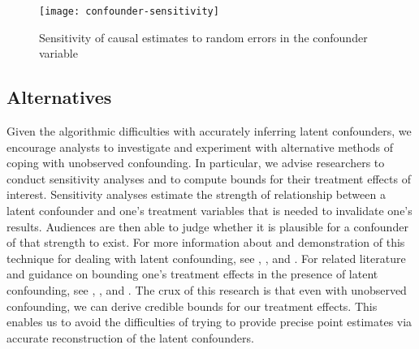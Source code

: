 \begin{figure}
   \centering
   \texttt{[image: confounder-sensitivity]}
   \caption{Sensitivity of causal estimates to random errors in the confounder variable}
   \label{fig:confounder-sensitivity}
\end{figure}

\subsection{Alternatives}
\label{sec:deconfounder-alternatives}
Given the algorithmic difficulties with accurately inferring latent confounders,
we encourage analysts to investigate and experiment with alternative methods of
coping with unobserved confounding.
In particular, we advise researchers to conduct sensitivity analyses and to compute bounds for their treatment effects of interest.
Sensitivity analyses estimate the strength of relationship between a latent confounder and one's treatment variables that is needed to invalidate one's results.
Audiences are then able to judge whether it is plausible for a confounder of that strength to exist.
For more information about and demonstration of this technique for dealing with latent confounding,
see \citet{rosenbaum_1983_assessing}, \citet{liu_2013_introduction}, and \citet{jung_2020_bayesian}.
For related literature and guidance on bounding one's treatment effects in the presence of latent confounding,
see \citet{manski_1990_nonparametric}, \citet{richardson_2014_nonparametric}, and \citet{geiger_2014_estimating}.
The crux of this research is that even with unobserved confounding, we can derive credible bounds for our treatment effects.
This enables us to avoid the difficulties of trying to provide precise point estimates via accurate reconstruction of the latent confounders.
